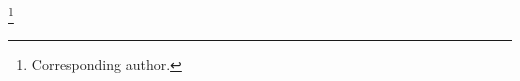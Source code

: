 \documentclass[aps,prc,onecolumn,floatfix,showpacs,preprintnumbers,amsmath,amssymb,superscriptaddress]{revtex4-1}
\begin{document}
\author {Michael~C.~Kunkel}
\author {Moskov~J.~Amaryan}
\thanks{Corresponding author.}
\affiliation{\ODU}
\author {Igor~I.~Strakovsky}
\affiliation{\GWU}
\author {James~Ritman}
\affiliation{\BOCHUM}

\end{document}
